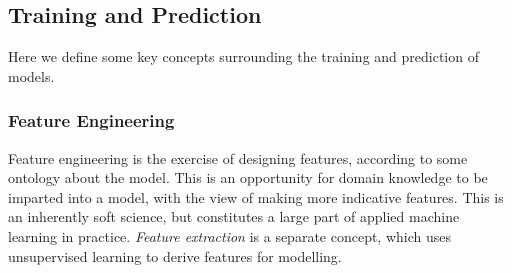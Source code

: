 \documentclass[11pt]{amsart}
\begin{document}
%
%
%
%
%

\subsection{Training and Prediction}

Here we define some key concepts surrounding the training and prediction of models.

\subsubsection{Feature Engineering} Feature engineering is the exercise of designing features, according to some ontology about the model. This is an opportunity for domain knowledge to be imparted into a model, with the view of making more indicative features. This is an inherently soft science, but constitutes a large part of applied machine learning in practice. \emph{Feature extraction} is a separate concept, which uses unsupervised learning to derive features for modelling.
\end{document}

